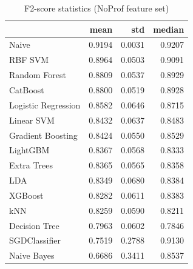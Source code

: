 \begin{table}
\caption{F2-score statistics (NoProf feature set)}
\label{tab:f2_NoProf_stats}
\begin{tabular}{lrrr}
\toprule
 & mean & std & median \\
\midrule
Naive & 0.9194 & 0.0031 & 0.9207 \\
RBF SVM & 0.8964 & 0.0503 & 0.9091 \\
Random Forest & 0.8809 & 0.0537 & 0.8929 \\
CatBoost & 0.8800 & 0.0519 & 0.8928 \\
Logistic Regression & 0.8582 & 0.0646 & 0.8715 \\
Linear SVM & 0.8432 & 0.0637 & 0.8483 \\
Gradient Boosting & 0.8424 & 0.0550 & 0.8529 \\
LightGBM & 0.8367 & 0.0568 & 0.8333 \\
Extra Trees & 0.8365 & 0.0565 & 0.8358 \\
LDA & 0.8349 & 0.0680 & 0.8384 \\
XGBoost & 0.8282 & 0.0611 & 0.8383 \\
kNN & 0.8259 & 0.0590 & 0.8211 \\
Decision Tree & 0.7963 & 0.0602 & 0.7846 \\
SGDClassifier & 0.7519 & 0.2788 & 0.9130 \\
Naive Bayes & 0.6686 & 0.3411 & 0.8537 \\
\bottomrule
\end{tabular}
\end{table}
